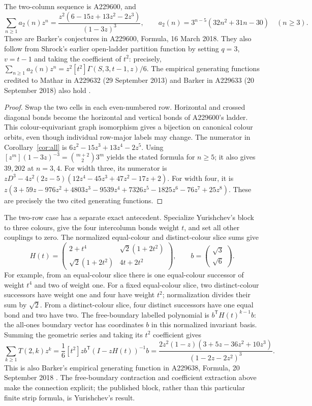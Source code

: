\begin{corollary}\label{cor:barker}
The two-column sequence is A229600, and
\[
\sum_{n\geq1}a_2(n)z^n
=\frac{z^2(6-15z+13z^2-2z^3)}{(1-3z)^3},\qquad
a_2(n)=3^{n-5}(32n^2+31n-30)\quad(n\geq3).
\]
These are Barker's conjectures in A229600, Formula, 16 March 2018.
They also follow from Shrock's earlier open-ladder partition function
\cite[Eqs.~(5.1)--(5.6)]{shrock} by setting $q=3$, $v=t-1$ and
taking the coefficient of $t^2$: precisely,
$\sum_{n\geq1}a_2(n)z^n=z^2[t^2]\Gamma(S,3,t-1,z)/6$.
The empirical generating functions credited to Mathar in A229632
(29 September 2013) and Barker in A229633 (20 September 2018)
also hold \cite{widthtwo,widththree,widthfour}.
\end{corollary}
\begin{proof}
Swap the two cells in each even-numbered row. Horizontal and crossed
diagonal bonds become the horizontal and vertical bonds of A229600's
ladder. This colour-equivariant graph isomorphism gives a bijection
on canonical colour orbits, even though individual row-major labels
may change. The numerator in Corollary~\ref{cor:all} is
$6z^2-15z^3+13z^4-2z^5$.
Using $[z^m](1-3z)^{-3}=\binom{m+2}{2}3^m$ yields the stated
formula for $n\geq5$; it also gives $39,202$ at $n=3,4$.
For width three, its numerator is
$zD^3-4z^2(2z-5)(12z^4-45z^3+47z^2-17z+2)$.
For width four, it is
$z(3+59z-976z^2+4803z^3-9539z^4+7326z^5-1825z^6-76z^7+25z^8)$.
These are precisely the two cited generating functions.
\end{proof}

The two-row case has a separate exact antecedent. Specialize
Yurishchev's block \cite[Eqs.~(5), (8), (9)]{yurishchev} to three
colours, give the four intercolumn bonds weight $t$, and set all
other couplings to zero. The normalized equal-colour and distinct-colour
slice sums give
\[
H(t)=\begin{pmatrix}
2+t^4&\sqrt2(1+2t^2)\\
\sqrt2(1+2t^2)&4t+2t^2
\end{pmatrix},\qquad b=\begin{pmatrix}\sqrt3\\\sqrt6\end{pmatrix}.
\]
For example, from an equal-colour slice there is one equal-colour
successor of weight $t^4$ and two of weight one. For a fixed
equal-colour slice, two distinct-colour successors have weight one and
four have weight $t^2$; normalization divides their sum by $\sqrt2$.
From a distinct-colour slice,
four distinct successors have one equal bond and two have two.
The free-boundary labelled polynomial is $b^{\mathsf T}H(t)^{k-1}b$:
the all-ones boundary vector has coordinates $b$ in this normalized
invariant basis. Summing the geometric series and taking its $t^2$
coefficient gives
\[
\sum_{k\geq1}T(2,k)z^k
=\frac16[t^2]z b^{\mathsf T}(I-zH(t))^{-1}b
=\frac{2z^2(1-z)(3+5z-36z^2+10z^3)}{(1-2z-2z^2)^3}.
\]
This is also Barker's empirical generating function in A229638,
Formula, 20 September 2018 \cite{rowtwo}. The free-boundary
contraction and coefficient extraction above make the connection
explicit; the published block, rather than this particular finite
strip formula, is Yurishchev's result.

